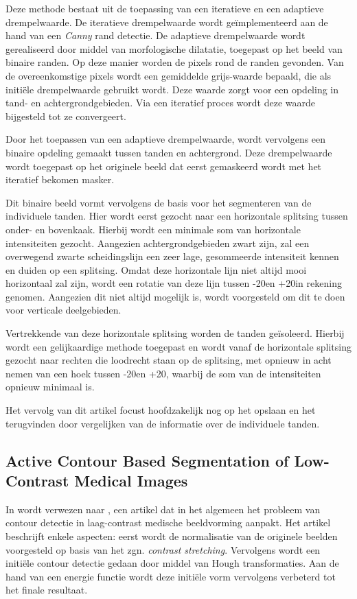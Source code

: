 \documentclass[10pt,a4paper]{article}
\begin{document}
Deze methode bestaat uit de toepassing van een iteratieve en een adaptieve drempelwaarde. De iteratieve drempelwaarde wordt ge\"implementeerd aan de hand van een \emph{Canny} rand detectie. De adaptieve drempelwaarde wordt gerealiseerd door middel van morfologische dilatatie, toegepast op het beeld van binaire randen. Op deze manier worden de pixels rond de randen gevonden. Van de overeenkomstige pixels wordt een gemiddelde grijs-waarde bepaald, die als initi\"ele drempelwaarde gebruikt wordt. Deze waarde zorgt voor een opdeling in tand- en achtergrondgebieden. Via een iteratief proces wordt deze waarde bijgesteld tot ze convergeert.

Door het toepassen van een adaptieve drempelwaarde, wordt vervolgens een binaire opdeling gemaakt tussen tanden en achtergrond. Deze drempelwaarde wordt toegepast op het originele beeld dat eerst gemaskeerd wordt met het iteratief bekomen masker.

Dit binaire beeld vormt vervolgens de basis voor het segmenteren van de individuele tanden. Hier wordt eerst gezocht naar een horizontale splitsing tussen onder- en bovenkaak. Hierbij wordt een minimale som van horizontale intensiteiten gezocht. Aangezien achtergrondgebieden zwart zijn, zal een overwegend zwarte scheidingslijn een zeer lage, gesommeerde intensiteit kennen en duiden op een splitsing. Omdat deze horizontale lijn niet altijd mooi horizontaal zal zijn, wordt een rotatie van deze lijn tussen -20\degree en +20\degree in rekening genomen. Aangezien dit niet altijd mogelijk is, wordt voorgesteld om dit te doen voor verticale deelgebieden.

Vertrekkende van deze horizontale splitsing worden de tanden ge\"isoleerd. Hierbij wordt een gelijkaardige methode toegepast en wordt vanaf de horizontale splitsing gezocht naar rechten die loodrecht staan op de splitsing, met opnieuw in acht nemen van een hoek tussen -20\degree en +20\degree, waarbij de som van de intensiteiten opnieuw minimaal is.

Het vervolg van dit artikel focust hoofdzakelijk nog op het opslaan en het terugvinden door vergelijken van de informatie over de individuele tanden.

\subsection*{Active Contour Based Segmentation of Low-Contrast Medical Images}

In \cite{abdel2003challenges} wordt verwezen naar \cite{piotrowski2000active}, een artikel dat in het algemeen het probleem van contour detectie in laag-contrast medische beeldvorming aanpakt. Het artikel beschrijft enkele aspecten: eerst wordt de normalisatie van de originele beelden voorgesteld op basis van het zgn. \emph{contrast stretching}. Vervolgens wordt een initi\"ele contour detectie gedaan door middel van Hough transformaties. Aan de hand van een energie functie wordt deze initi\"ele vorm vervolgens verbeterd tot het finale resultaat.
\end{document}
